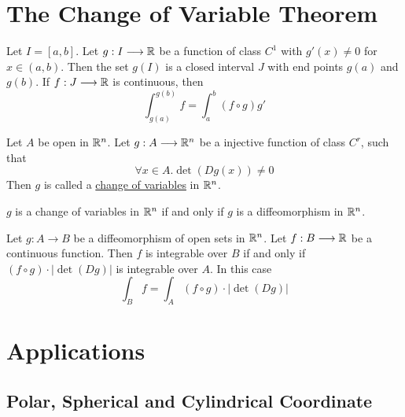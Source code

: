 \section{The Change of Variable Theorem}

\begin{theorem}
    Let $I=[a,b]$. Let $g:I\longrightarrow\mathbb{R}$ be a function of class $C^1$ with $g'(x)\neq0$ for $x\in(a,b)$.
    Then the set $g(I)$ is a closed interval $J$ with end points $g(a)$ and $g(b)$.
    If $f:J\longrightarrow\mathbb{R}$ is continuous, then $$\int_{g(a)}^{g(b)}f=\int_a^b(f\circ g)g'$$
\end{theorem}

\begin{definition}
    Let $A$ be open in $\mathbb{R}^n$. Let $g:A\longrightarrow\mathbb{R}^n$ be a injective function of class $C^r$, such that $$\forall x\in A.\det(Dg(x))\neq0$$
    Then $g$ is called a \underline{change of variables} in $\mathbb{R}^n$.
\end{definition}

\begin{theorem}
    $g$ is a change of variables in $\mathbb{R}^n$ if and only if $g$ is a diffeomorphism in $\mathbb{R}^n$.
\end{theorem}

\begin{theorem}\label{Change of variables theorem}
    Let $g:A\longrightarrow B$ be a diffeomorphism of open sets in $\mathbb{R}^n$. Let $f:B\longrightarrow \mathbb{R}$ be a continuous function. 
    Then $f$ is integrable over $B$ if and only if $(f\circ g)\cdot |\det(Dg)|$ is integrable over $A$. In this case 
    $$\int_Bf=\int_A(f\circ g)\cdot |\det(Dg)|$$
\end{theorem}

\section{Applications}

\subsection{Polar, Spherical and Cylindrical Coordinate}

